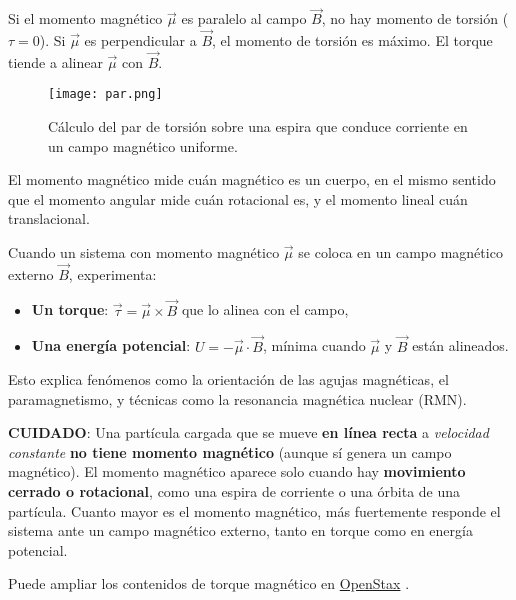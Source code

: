 Si el momento magnético \(\vec{\mu}\) es paralelo al campo \(\vec{B}\), no hay momento de torsión (\(\tau = 0\)). Si \(\vec{\mu}\) es perpendicular a \(\vec{B}\), el momento de torsión es máximo. El torque tiende a alinear \(\vec{\mu}\) con \(\vec{B}\).

\begin{figure}[ht]
  \centering
  \texttt{[image: par.png]}
  \caption{Cálculo del par de torsión sobre una espira que conduce corriente en un campo magnético uniforme.}
\end{figure}

\begin{tcolorbox}[myconclusion]
  El momento magnético mide cuán magnético es un cuerpo, en el mismo sentido que el momento angular mide cuán rotacional es, y el momento lineal cuán translacional.
\end{tcolorbox}

Cuando un sistema con momento magnético \(\vec{\mu}\) se coloca en un campo magnético externo \(\vec{B}\), experimenta:
\begin{itemize}
  \item \textbf{Un torque}: \(\vec{\tau}=\vec{\mu}\times\vec{B}\) que lo alinea con el campo,
  \item \textbf{Una energía potencial}: \(U=-\vec{\mu}\cdot\vec{B}\), mínima cuando \(\vec{\mu}\) y \(\vec{B}\) están alineados.
\end{itemize}
Esto explica fenómenos como la orientación de las agujas magnéticas, el paramagnetismo, y técnicas como la resonancia magnética nuclear (RMN).

\begin{tcolorbox}[mydanger]
  \textbf{CUIDADO}: Una partícula cargada que se mueve \textbf{en línea recta} a \textit{velocidad constante} \textbf{no tiene momento magnético} (aunque sí genera un campo magnético). El momento magnético aparece solo cuando hay \textbf{movimiento cerrado o rotacional}, como una espira de corriente o una órbita de una partícula. Cuanto mayor es el momento magnético, más fuertemente responde el sistema ante un campo magnético externo, tanto en torque como en energía potencial.
\end{tcolorbox}

Puede ampliar los contenidos de torque magnético en \href{https://openstax.org/books/f%C3%ADsica-universitaria-volumen-2/pages/11-5-fuerza-y-torque-en-un-bucle-de-corriente}{OpenStax} \cite{openstax}.

